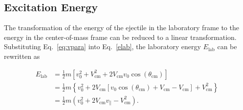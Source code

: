 \subsection{Excitation Energy}
The transformation of the energy of the ejectile in the laboratory frame to the energy in the center-of-mass frame can be reduced to a linear transformation.  Substituting Eq.~\ref{eq:vpara} into Eq.~\ref{elab}, the laboratory energy $E_\mathrm{lab}$ can be rewritten as

\begin{equation}
\begin{split}
E_\mathrm{lab}&=\frac{1}{2} m\left[v_0^2+V_\mathrm{cm}^2 +2V_\mathrm{cm}v_0 \cos(\theta_\mathrm{cm})\right]\\
&=\frac{1}{2} m\left\{v_0^2+2V_\mathrm{cm}[v_0 \cos(\theta_\mathrm{cm})+V_\mathrm{cm}-V_\mathrm{cm}]+V_\mathrm{cm}^2 \right\}\\
&=\frac{1}{2} m\left(v_0^2+2V_\mathrm{cm}v_\parallel -V_\mathrm{cm}^2\right).
\end{split}
\label{elab_of_vpara}
\end{equation}

